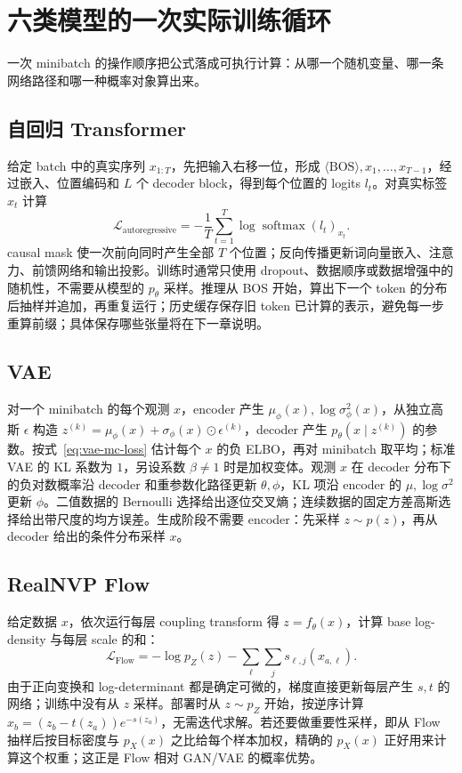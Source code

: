 \section{六类模型的一次实际训练循环}

一次 minibatch 的操作顺序把公式落成可执行计算：从哪一个随机变量、哪一条网络路径和哪一种概率对象算出来。

\subsection{自回归 Transformer}

给定 batch 中的真实序列 \(x_{1:T}\)，先把输入右移一位，形成 \(\langle\mathrm{BOS}\rangle,x_1,\ldots,x_{T-1}\)，经过嵌入、位置编码和 \(L\) 个 decoder block，得到每个位置的 logits \(l_t\)。对真实标签 \(x_t\) 计算
\begin{equation}
\mathcal L_{\mathrm{autoregressive}}=-\frac1T\sum_{t=1}^{T}
\log\operatorname{softmax}(l_t)_{x_t}.
\end{equation}
causal mask 使一次前向同时产生全部 \(T\) 个位置；反向传播更新词向量嵌入、注意力、前馈网络和输出投影。训练时通常只使用 dropout、数据顺序或数据增强中的随机性，不需要从模型的 \(p_\theta\) 采样。推理从 BOS 开始，算出下一个 token 的分布后抽样并追加，再重复运行；历史缓存保存旧 token 已计算的表示，避免每一步重算前缀；具体保存哪些张量将在下一章说明。

\subsection{VAE}

对一个 minibatch 的每个观测 \(x\)，encoder 产生 \(\mu_\phi(x),\log\sigma_\phi^2(x)\)，从独立高斯 \(\epsilon\) 构造 \(z^{(k)}=\mu_\phi(x)+\sigma_\phi(x)\odot\epsilon^{(k)}\)，decoder 产生 \(p_\theta(x\mid z^{(k)})\) 的参数。按式~\eqref{eq:vae-mc-loss} 估计每个 \(x\) 的负 ELBO，再对 minibatch 取平均；标准 VAE 的 KL 系数为 \(1\)，另设系数 \(\beta\neq1\) 时是加权变体。观测 \(x\) 在 decoder 分布下的负对数概率沿 decoder 和重参数化路径更新 \(\theta,\phi\)，KL 项沿 encoder 的 \(\mu,\log\sigma^2\) 更新 \(\phi\)。二值数据的 Bernoulli 选择给出逐位交叉熵；连续数据的固定方差高斯选择给出带尺度的均方误差。生成阶段不需要 encoder：先采样 \(z\sim p(z)\)，再从 decoder 给出的条件分布采样 \(x\)。

\subsection{RealNVP Flow}

给定数据 \(x\)，依次运行每层 coupling transform 得 \(z=f_\theta(x)\)，计算 base log-density 与每层 scale 的和：
\begin{equation}
\mathcal L_{\mathrm{Flow}}
=-\log p_Z(z)-\sum_{\ell}\sum_j s_{\ell,j}(x_{a,\ell}).
\end{equation}
由于正向变换和 log-determinant 都是确定可微的，梯度直接更新每层产生 \(s,t\) 的网络；训练中没有从 \(z\) 采样。部署时从 \(z\sim p_Z\) 开始，按逆序计算 \(x_b=(z_b-t(z_a))e^{-s(z_a)}\)，无需迭代求解。若还要做重要性采样，即从 Flow 抽样后按目标密度与 \(p_X(x)\) 之比给每个样本加权，精确的 \(p_X(x)\) 正好用来计算这个权重；这正是 Flow 相对 GAN/VAE 的概率优势。


